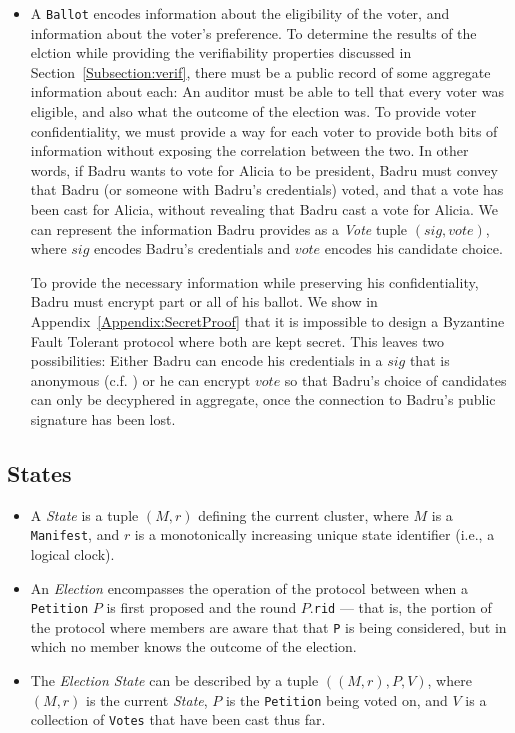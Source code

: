 \begin{itemize}
  \item A \texttt{Ballot} encodes information about the eligibility of the voter,
    and information about the voter's preference. To determine the results of
    the elction while providing the verifiability properties discussed in
    Section~\ref{Subsection:verif}, there must be a public record of some
    aggregate information about each: An auditor must be able to tell that every
    voter was eligible, and also what the outcome of the election was. To
    provide voter confidentiality, we must provide a way for each voter to
    provide both bits of information without exposing the correlation between
    the two. In other words, if Badru wants to vote for Alicia to be president,
    Badru must convey that Badru (or someone with Badru's credentials) voted,
    and that a vote has been cast for Alicia, without revealing that Badru cast
    a vote for Alicia. We can represent the information Badru provides as a
    \emph{Vote} tuple $(sig, vote)$, where $sig$ encodes Badru's credentials and
    $vote$ encodes his candidate choice.

    To provide the necessary information while preserving his
    confidentiality, Badru must encrypt part or all of his ballot.
    We show
    in Appendix~\ref{Appendix:SecretProof} that it is impossible to design
    a Byzantine Fault Tolerant protocol where both are kept secret. This leaves
    two possibilities:
    Either Badru can encode his credentials in a $sig$ that is anonymous
    (c.f. \cite{lrs})
    or he can encrypt $vote$ so that Badru's choice of candidates can only be
    decyphered in aggregate, once the connection to Badru's public signature has
    been lost.

\end{itemize}

\subsection{States}
\begin{itemize}
  \item A \emph{State} is a tuple $(M, r)$ defining the current cluster, where
    $M$ is a \texttt{Manifest}, and $r$ is a monotonically increasing unique
    state identifier (i.e., a logical clock)\tocite.

  \item An \emph{Election} encompasses the operation of the protocol between
    when a \texttt{Petition} $P$ is first proposed and the round
    $P$.\texttt{rid} --- that is, the portion of the protocol where members are
    aware that that \texttt{P} is being considered, but in which no member knows
    the outcome of the election.

  \item The \emph{Election State} can be described by a tuple
    $((M, r), P, V)$, where $(M, r)$ is the current \emph{State}, $P$ is the
    \texttt{Petition} being voted on, and $V$ is a collection of \texttt{Votes}
    that have been cast thus far.

\end{itemize}

